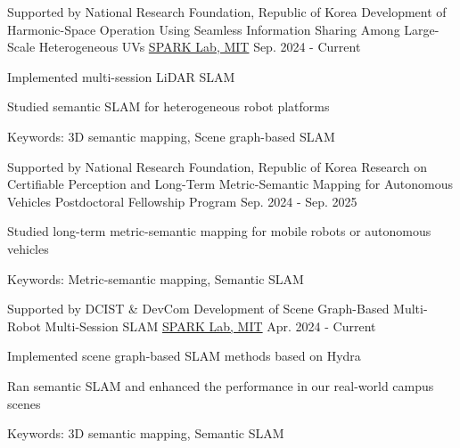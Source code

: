 

\newcommand{\spark}{\href{https://mit.edu/sparklab/}{SPARK Lab, MIT}}
\newcommand{\urban}{\href{https://urobot.kaist.ac.kr/}{Urban Robotics Lab., KAIST}}
\begin{cventries}
  \cventry
    {Supported by National Research Foundation, Republic of Korea} %
    {Development of Harmonic-Space Operation Using Seamless Information Sharing Among Large-Scale Heterogeneous UVs}
    {\spark} %
    {Sep. 2024 - Current} %
    {
      \begin{cvitems} %
        \item Implemented multi-session LiDAR SLAM
        \item Studied semantic SLAM for heterogeneous robot platforms
        \item Keywords: 3D semantic mapping, Scene graph-based SLAM
      \end{cvitems}
    }

  \cventry
    {Supported by National Research Foundation, Republic of Korea} 
    {Research on Certifiable Perception and Long-Term Metric-Semantic Mapping for Autonomous Vehicles} 
    {Postdoctoral Fellowship Program} 
    {Sep. 2024 - Sep. 2025} %
    {
      \begin{cvitems} %
        \item Studied long-term metric-semantic mapping for mobile robots or autonomous vehicles
        \item Keywords: Metric-semantic mapping, Semantic SLAM
      \end{cvitems}
    }

 \cventry
    {Supported by DCIST \& DevCom} %
    {Development of Scene Graph-Based Multi-Robot Multi-Session SLAM} %
    {\spark} %
    {Apr. 2024 - Current} %
    {
      \begin{cvitems} %
        \item Implemented scene graph-based SLAM methods based on Hydra
        \item Ran semantic SLAM and enhanced the performance in our real-world campus scenes
        \item Keywords: 3D semantic mapping, Semantic SLAM
      \end{cvitems}
    }


\end{cventries}
